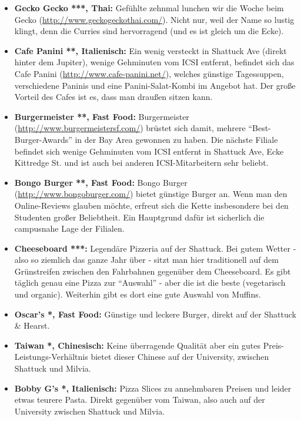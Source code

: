 \documentclass[a4paper]{scrreprt}
\begin{document}
\begin{itemize}
  \item \textbf{Gecko Gecko ***, Thai:} Gefühlte zehnmal lunchen wir die Woche beim Gecko (\url{http://www.geckogeckothai.com/}). Nicht nur, weil der Name so lustig klingt, denn die Curries sind hervorragend (und es ist gleich um die Ecke).

	\item \textbf{Cafe Panini **, Italienisch:} Ein wenig versteckt in Shattuck Ave (direkt hinter dem Jupiter), wenige Gehminuten vom ICSI entfernt, befindet sich das Cafe Panini (\url{http://www.cafe-panini.net/}), welches günstige Tagessuppen, verschiedene Paninis und eine Panini-Salat-Kombi im Angebot hat. Der große Vorteil des Cafes ist es, dass man draußen sitzen kann.

  \item \textbf{Burgermeister **, Fast Food:} Burgermeister (\url{http://www.burgermeistersf.com/}) brüstet sich damit, mehrere	 "`Best-Burger-Awards"' in der Bay Area gewonnen zu haben. Die nächste Filiale befindet sich wenige Gehminuten vom ICSI entfernt in Shattuck Ave, Ecke Kittredge St. und ist auch bei anderen ICSI-Mitarbeitern sehr beliebt.

  \item \textbf{Bongo Burger **, Fast Food:} Bongo Burger (\url{http://www.bongoburger.com/}) bietet günstige Burger an. Wenn man den Online-Reviews glauben möchte, erfreut sich die Kette insbesondere bei den Studenten großer Beliebtheit. Ein Hauptgrund dafür ist sicherlich die campusnahe Lage der Filialen.

	\item \textbf{Cheeseboard ***:} Legendäre Pizzeria auf der Shattuck. Bei gutem Wetter - also so ziemlich das ganze Jahr über - sitzt man hier traditionell auf dem Grünstreifen zwischen den Fahrbahnen gegenüber dem Cheeseboard. Es gibt täglich genau eine Pizza zur "`Auswahl"' - aber die ist die beste (vegetarisch und organic). Weiterhin gibt es dort eine gute Auswahl von Muffins.

  \item \textbf{Oscar's *, Fast Food:} Günstige und leckere Burger, direkt auf der Shattuck \& Hearst.

	\item \textbf{Taiwan *, Chinesisch:} Keine überragende Qualität aber ein gutes Preis-Leistungs-Verhältnis bietet dieser Chinese auf der University, zwischen Shattuck und Milvia.

	\item \textbf{Bobby G's *, Italienisch:} Pizza Slices zu annehmbaren Preisen und leider etwas teurere Pasta. Direkt gegenüber vom Taiwan, also auch auf der University zwischen Shattuck und Milvia.
  

\end{itemize}
\end{document}
